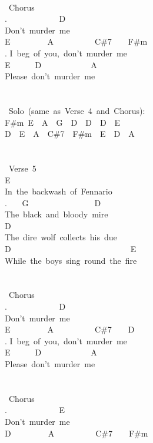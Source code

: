{\\
\lbrack\ Chorus\rbrack\\
. \ \ \ \ \ \ \ \ \ \ \ \ D\\
Don't\ murder\ me\\
E\ \ \ \ \ \ \ \ \ A\ \ \ \ \ \ \ \ \ \ C\#7\ \ \ \ F\#m\\
. I\ beg\ of\ you,\ don't\ murder\ me\\
E\ \ \ \ \ \ D\ \ \ \ \ \ \ \ \ \ \ \ A\\
Please\ don't\ murder\ me\\
\\
\\
\lbrack\ Solo\rbrack\ (same\ as\ Verse\ 4\ and\ Chorus):\\
F\#m\ E\ \ A\ \ G\ \ D\ \ D\ \ D\ \ E\ \ \\
D\ \ E\ \ A\ \ C\#7\ \ F\#m\ \ E\ \ D\ \ A\\
\\
\\
\lbrack\ Verse\ 5\rbrack\\
E\\
In\ the\ backwash\ of\ Fennario\\
. \ \ \ G\ \ \ \ \ \ \ \ \ \ \ \ \ \ \ \ D\\
The\ black\ and\ bloody\ mire\\
D\ \\
The\ dire\ wolf\ collects\ his\ due\\
D\ \ \ \ \ \ \ \ \ \ \ \ \ \ \ \ \ \ \ \ \ \ \ \ \ \ \ \ \ E\\
While\ the\ boys\ sing\ round\ the\ fire\\
\\
\\
\lbrack\ Chorus\rbrack\\
. \ \ \ \ \ \ \ \ \ \ \ \ D\\
Don't\ murder\ me\\
E\ \ \ \ \ \ \ \ \ A\ \ \ \ \ \ \ \ \ \ C\#7\ \ \ \ D\\
. I\ beg\ of\ you,\ don't\ murder\ me\\
E\ \ \ \ \ \ D\ \ \ \ \ \ \ \ \ \ \ \ A\\
Please\ don't\ murder\ me\\
\\
\\
\lbrack\ Chorus\rbrack\\
. \ \ \ \ \ \ \ \ \ \ \ \ E\\
Don't\ murder\ me\\
D\ \ \ \ \ \ \ \ \ A\ \ \ \ \ \ \ \ \ \ C\#7\ \ \ \ F\#m\\
}
